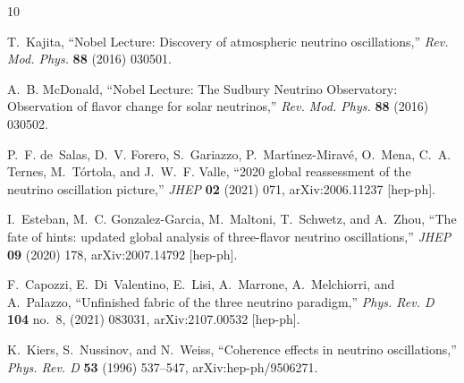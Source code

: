 \documentclass[aps, prd, onecolumn, tightenlines, notitlepage, superscriptaddress, nofootinbib, preprintnumbers, floatfix,showkeys,11pt]{revtex4-2}
\begin{document}
\noindent

\appendix






%
%  





\providecommand{\href}[2]{#2}\begingroup\raggedright\begin{thebibliography}{10}

T.~Kajita, ``{Nobel Lecture: Discovery of atmospheric neutrino oscillations},''
  \href{http://dx.doi.org/10.1103/RevModPhys.88.030501}{{\em Rev. Mod. Phys.}
  {\bfseries 88} (2016) 030501}.

A.~B. McDonald, ``{Nobel Lecture: The Sudbury Neutrino Observatory: Observation
  of flavor change for solar neutrinos},''
  \href{http://dx.doi.org/10.1103/RevModPhys.88.030502}{{\em Rev. Mod. Phys.}
  {\bfseries 88} (2016) 030502}.

P.~F. de~Salas, D.~V. Forero, S.~Gariazzo, P.~Mart\'\i{}nez-Mirav\'e, O.~Mena,
  C.~A. Ternes, M.~T\'ortola, and J.~W.~F. Valle, ``{2020 global reassessment
  of the neutrino oscillation picture},''
  \href{http://dx.doi.org/10.1007/JHEP02(2021)071}{{\em JHEP} {\bfseries 02}
  (2021) 071}, \href{http://arxiv.org/abs/2006.11237}{{\ttfamily
  arXiv:2006.11237 [hep-ph]}}.

I.~Esteban, M.~C. Gonzalez-Garcia, M.~Maltoni, T.~Schwetz, and A.~Zhou, ``{The
  fate of hints: updated global analysis of three-flavor neutrino
  oscillations},'' \href{http://dx.doi.org/10.1007/JHEP09(2020)178}{{\em JHEP}
  {\bfseries 09} (2020) 178}, \href{http://arxiv.org/abs/2007.14792}{{\ttfamily
  arXiv:2007.14792 [hep-ph]}}.

F.~Capozzi, E.~Di~Valentino, E.~Lisi, A.~Marrone, A.~Melchiorri, and
  A.~Palazzo, ``{Unfinished fabric of the three neutrino paradigm},''
  \href{http://dx.doi.org/10.1103/PhysRevD.104.083031}{{\em Phys. Rev. D}
  {\bfseries 104} no.~8, (2021) 083031},
  \href{http://arxiv.org/abs/2107.00532}{{\ttfamily arXiv:2107.00532
  [hep-ph]}}.

K.~Kiers, S.~Nussinov, and N.~Weiss, ``{Coherence effects in neutrino
  oscillations},'' \href{http://dx.doi.org/10.1103/PhysRevD.53.537}{{\em Phys.
  Rev. D} {\bfseries 53} (1996) 537--547},
  \href{http://arxiv.org/abs/hep-ph/9506271}{{\ttfamily arXiv:hep-ph/9506271}}.


\end{thebibliography}
\end{document}
